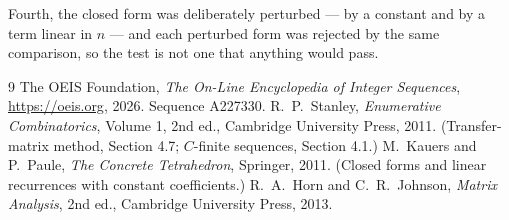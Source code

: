 \documentclass[11pt,a4paper]{article}
\theoremstyle{plain}
\theoremstyle{definition}
\begin{document}
Fourth, the closed form was deliberately perturbed --- by a constant and by a term linear in
$n$ --- and each perturbed form was rejected by the same comparison, so the test is not one
that anything would pass.

\begin{thebibliography}{9}
 The OEIS Foundation, \emph{The On-Line Encyclopedia of Integer
Sequences}, \url{https://oeis.org}, 2026. Sequence A227330.
 R.~P.~Stanley, \emph{Enumerative Combinatorics}, Volume 1, 2nd ed.,
Cambridge University Press, 2011. (Transfer-matrix method, Section 4.7; $C$-finite sequences,
Section 4.1.)
 M.~Kauers and P.~Paule, \emph{The Concrete Tetrahedron}, Springer, 2011.
(Closed forms and linear recurrences with constant coefficients.)
 R.~A.~Horn and C.~R.~Johnson, \emph{Matrix Analysis}, 2nd ed., Cambridge
University Press, 2013.
\end{thebibliography}
\end{document}
